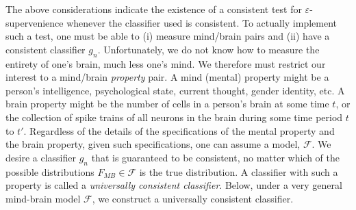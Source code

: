 \documentclass{article}
\providecommand{\mc}[1]{\mathcal{#1}}
\newcommand{\eps}{\varepsilon}
\newcommand{\conv}{\rightarrow}
\newcommand{\hL}{\widehat{L}}
\begin{document}
The above considerations indicate the existence of a consistent test for $\eps$-supervenience whenever the classifier used is consistent.  
To actually implement such a test, one must be able to (i) measure mind/brain pairs and (ii) have a consistent classifier $g_n$.  Unfortunately, we do not know how to measure the entirety of one's brain, much less one's mind. 
We therefore must restrict our interest to a mind/brain \emph{property} pair.  
A mind (mental) property might be a person's intelligence, psychological state, current thought, gender identity, etc.  A brain property might be the number of cells in a person's brain at some time $t$, or the collection of spike trains of all neurons in the brain during some time period $t$ to $t'$.  Regardless of the details of the specifications of the mental property and the brain property, given such specifications, one can assume a model, $\mc{F}$.  We desire a classifier $g_n$ that is guaranteed to be consistent, no matter which of the possible distributions $F_{MB} \in \mc{F}$ is the true distribution.  A classifier with such a property is called a \emph{universally consistent classifier}.  
Below, under a very general mind-brain model $\mc{F}$, we construct a universally consistent classifier. 


\end{document}
